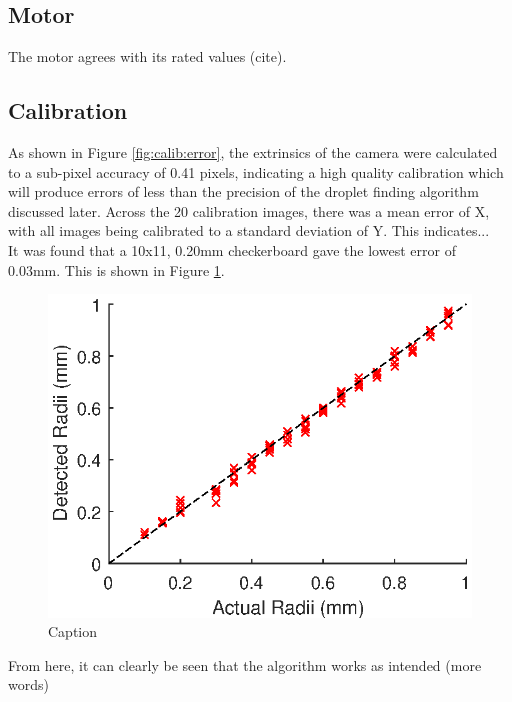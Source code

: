 \documentclass{physics_article_B}
\begin{document}
    \subsection{Motor}
    
    The motor agrees with its rated values (cite).
    
    \subsection{Calibration}
    As shown in Figure \ref{fig:calib:error}, the extrinsics of the camera were calculated to a sub-pixel accuracy of 0.41 pixels, indicating a high quality calibration which will produce errors of less than the precision of the droplet finding algorithm discussed later. Across the 20 calibration images, there was a mean error of X, with all images being calibrated to a standard deviation of Y. This indicates...\\
        
    
    It was found that a 10x11, 0.20mm checkerboard gave the lowest error of 0.03mm. This is shown in Figure \ref{fig:calibsize}. 
        
        \begin{figure}[H]
            \centering
            \includegraphics{Figures/CameraCalib.eps}
            \caption{Caption}
            \label{fig:calibsize}
        \end{figure}
        
        From here, it can clearly be seen that the algorithm works as intended (more words)
\end{document}
